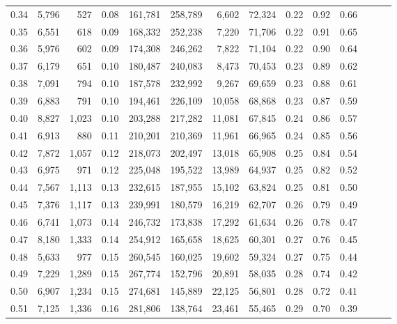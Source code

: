\begin{tabular}{rrrrrrrrrrrrrr}
0.34 &   5,796 &    527 &  0.08 &  161,781 &  258,789 &   6,602 &  72,324 &  0.22 &  0.92 &      0.66 \\
0.35 &   6,551 &    618 &  0.09 &  168,332 &  252,238 &   7,220 &  71,706 &  0.22 &  0.91 &      0.65 \\
0.36 &   5,976 &    602 &  0.09 &  174,308 &  246,262 &   7,822 &  71,104 &  0.22 &  0.90 &      0.64 \\
0.37 &   6,179 &    651 &  0.10 &  180,487 &  240,083 &   8,473 &  70,453 &  0.23 &  0.89 &      0.62 \\
0.38 &   7,091 &    794 &  0.10 &  187,578 &  232,992 &   9,267 &  69,659 &  0.23 &  0.88 &      0.61 \\
0.39 &   6,883 &    791 &  0.10 &  194,461 &  226,109 &  10,058 &  68,868 &  0.23 &  0.87 &      0.59 \\
0.40 &   8,827 &  1,023 &  0.10 &  203,288 &  217,282 &  11,081 &  67,845 &  0.24 &  0.86 &      0.57 \\
0.41 &   6,913 &    880 &  0.11 &  210,201 &  210,369 &  11,961 &  66,965 &  0.24 &  0.85 &      0.56 \\
0.42 &   7,872 &  1,057 &  0.12 &  218,073 &  202,497 &  13,018 &  65,908 &  0.25 &  0.84 &      0.54 \\
0.43 &   6,975 &    971 &  0.12 &  225,048 &  195,522 &  13,989 &  64,937 &  0.25 &  0.82 &      0.52 \\
0.44 &   7,567 &  1,113 &  0.13 &  232,615 &  187,955 &  15,102 &  63,824 &  0.25 &  0.81 &      0.50 \\
0.45 &   7,376 &  1,117 &  0.13 &  239,991 &  180,579 &  16,219 &  62,707 &  0.26 &  0.79 &      0.49 \\
0.46 &   6,741 &  1,073 &  0.14 &  246,732 &  173,838 &  17,292 &  61,634 &  0.26 &  0.78 &      0.47 \\
0.47 &   8,180 &  1,333 &  0.14 &  254,912 &  165,658 &  18,625 &  60,301 &  0.27 &  0.76 &      0.45 \\
0.48 &   5,633 &    977 &  0.15 &  260,545 &  160,025 &  19,602 &  59,324 &  0.27 &  0.75 &      0.44 \\
0.49 &   7,229 &  1,289 &  0.15 &  267,774 &  152,796 &  20,891 &  58,035 &  0.28 &  0.74 &      0.42 \\
0.50 &   6,907 &  1,234 &  0.15 &  274,681 &  145,889 &  22,125 &  56,801 &  0.28 &  0.72 &      0.41 \\
0.51 &   7,125 &  1,336 &  0.16 &  281,806 &  138,764 &  23,461 &  55,465 &  0.29 &  0.70 &      0.39 \\

\end{tabular}
